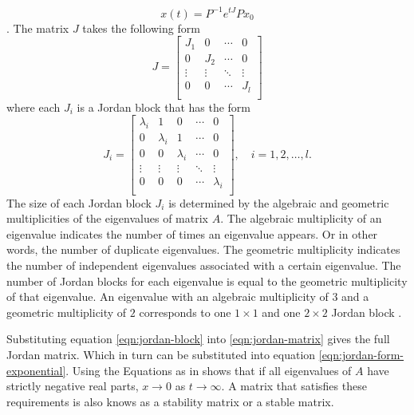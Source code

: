\begin{equation}\label{eqn:jordan-form-exponential}
    x(t) = P^{-1}e^{tJ}Px_0
\end{equation}
\cite[Section 7.3]{Hespanha2018LinearTheory}. The matrix $J$ takes the following form
\begin{equation}\label{eqn:jordan-matrix}
    J =
    \begin{bmatrix}
        J_1 & 0 & \cdots & 0 \\
        0 & J_2 & \cdots & 0 \\
        \vdots & \vdots & \ddots & \vdots \\
        0 & 0 & \cdots & J_l \\
    \end{bmatrix}
\end{equation}
where each $J_i$ is a Jordan block that has the form
\begin{equation}\label{eqn:jordan-block}
    J_i = 
    \begin{bmatrix}
        \lambda_i & 1 & 0 & \cdots & 0 \\
        0 & \lambda_i & 1 & \cdots & 0 \\
        0 & 0 & \lambda_i & \cdots & 0 \\
        \vdots & \vdots & \vdots & \ddots & \vdots \\
        0 & 0 & 0 & \cdots & \lambda_i \\
    \end{bmatrix}, \quad i=1,2,\dots,l.
\end{equation}
The size of each Jordan block $J_i$ is determined by the algebraic and geometric multiplicities of the eigenvalues of matrix $A$. The algebraic multiplicity of an eigenvalue indicates the number of times an eigenvalue appears. Or in other words, the number of duplicate eigenvalues. The geometric multiplicity indicates the number of independent eigenvalues associated with a certain eigenvalue.  The number of Jordan blocks for each eigenvalue is equal to the geometric multiplicity of that eigenvalue. An eigenvalue with an algebraic multiplicity of $3$ and a geometric multiplicity of $2$ corresponds to one $1 \times 1$ and one $2 \times 2$ Jordan block \cite[Section 7.1] {Hespanha2018LinearTheory}.

Substituting equation \eqref{eqn:jordan-block} into \eqref{eqn:jordan-matrix} gives the full Jordan matrix. Which in turn can be substituted into equation \eqref{eqn:jordan-form-exponential}. Using the Equations as in \cite[Section 7.3]{Hespanha2018LinearTheory} shows that if all eigenvalues of $A$ have strictly negative real parts, $x \rightarrow 0$ as $t \rightarrow \infty$. A matrix that satisfies these requirements is also knows as a stability matrix or a stable matrix. 

